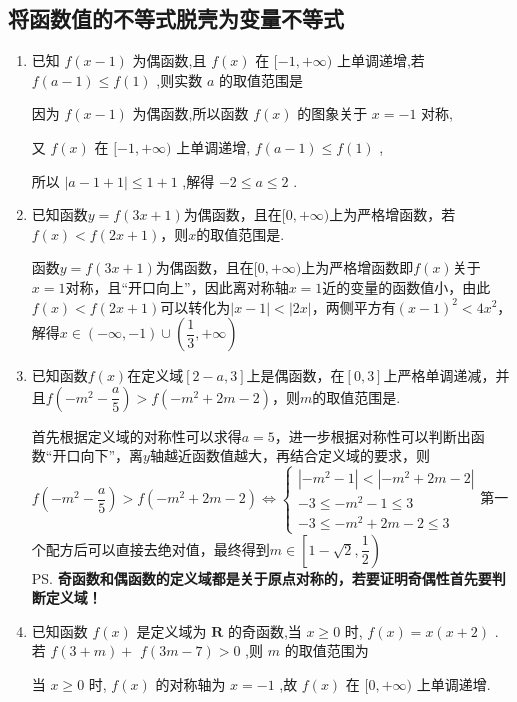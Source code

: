 \subsection*{将函数值的不等式脱壳为变量不等式}
\begin{enumerate}
    \item 已知 $f\left( {x - 1}\right)$ 为偶函数,且 $f\left( x\right)$ 在 $\lbrack  - 1, + \infty )$ 上单调递增,若 $f\left( {a - 1}\right)  \leq  f\left( 1\right)$ ,则实数 $a$ 的取值范围是\blkda{$[-2, 2]$}
    \begin{jieda}
        因为 $f\left( {x - 1}\right)$ 为偶函数,所以函数 $f\left( x\right)$ 的图象关于 $x =  - 1$ 对称,
        
        又 $f\left( x\right)$ 在 $\lbrack  - 1, + \infty )$ 上单调递增, $f\left( {a - 1}\right)  \leq  f\left( 1\right)$ ,
        
        所以 $\left| {a - 1 + 1}\right|  \leq  1 + 1$ ,解得 $- 2 \leq  a \leq  2$ .
    \end{jieda}
    \item 已知函数$y = f(3x+1)$为偶函数，且在$[0, +\infty)$上为严格增函数，若$f(x) < f(2x+1)$，则$x$的取值范围是.
    \begin{jieda}
        函数$y = f(3x+1)$为偶函数，且在$[0, +\infty)$上为严格增函数即$f(x)$关于$x = 1$对称，且“开口向上”，因此离对称轴$x = 1$近的变量的函数值小，由此$f(x) < f(2x+1)$可以转化为$|x-1| < |2x|$，两侧平方有$(x-1)^2 < 4x^2$，解得$x \in (-\infty, -1) \cup (\dfrac{1}{3}, +\infty)$
    \end{jieda}
    \item 已知函数$f(x)$在定义域$[2-a, 3]$上是偶函数，在$[0, 3]$上严格单调递减，并且$f\left(-m^2-\dfrac{a}{5}\right) > f(-m^2+2m-2)$，则$m$的取值范围是\blkda[3]{$\left[1-\sqrt{2}, \dfrac{1}{2}\right)$}.
    \begin{jieda}
        首先根据定义域的对称性可以求得$a = 5$，进一步根据对称性可以判断出函数“开口向下”，离$y$轴越近函数值越大，再结合定义域的要求，则$f\left(-m^2-\dfrac{a}{5}\right)  > f(-m^2+2m-2) \Longleftrightarrow \left \{ \begin{array}{l}
             |-m^2-1| < |-m^2+2m-2|  \\
             -3 \leq -m^2-1 \leq 3  \\
             -3 \leq -m^2+2m-2 \leq 3 
        \end{array}\right.$第一个配方后可以直接去绝对值，最终得到$m \in \left[1-\sqrt{2}, \dfrac{1}{2}\right)$ \\
        \ps \textbf{奇函数和偶函数的定义域都是关于原点对称的，若要证明奇偶性首先要判断定义域！}
    \end{jieda}
    \item 已知函数 $f\left( x\right)$ 是定义域为 $\mathbf{R}$ 的奇函数,当 $x \geq  0$ 时, $f\left( x\right)  = x\left( {x + 2}\right)$ . 若 $f\left( {3 + m}\right)  +$  $f\left( {{3m} - 7}\right)  > 0$ ,则 $m$ 的取值范围为
    \begin{jieda}
        当 $x \geq  0$ 时, $f\left( x\right)$ 的对称轴为 $x =  - 1$ ,故 $f\left( x\right)$ 在 $\lbrack 0, + \infty )$ 上单调递增.


\end{jieda}
\end{enumerate}
